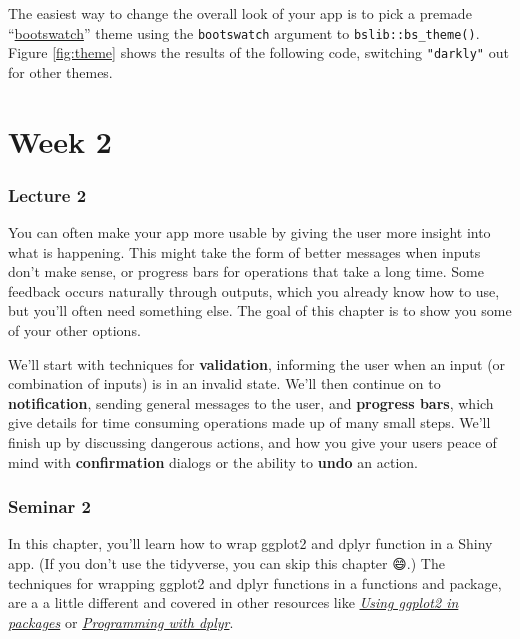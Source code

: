 \documentclass[
]{article}
\begin{document}
The easiest way to change the overall look of your app is to pick a premade ``\href{https://bootswatch.com}{bootswatch}'' theme using the \texttt{bootswatch} argument to \texttt{bslib::bs\_theme()}.
Figure \ref{fig:theme} shows the results of the following code, switching \texttt{"darkly"} out for other themes.

\hypertarget{part-week-2}{%
\part*{Week 2}\label{part-week-2}}

\hypertarget{lecture2}{%
\section{Lecture 2}\label{lecture2}}

You can often make your app more usable by giving the user more insight into what is happening.
This might take the form of better messages when inputs don't make sense, or progress bars for operations that take a long time.
Some feedback occurs naturally through outputs, which you already know how to use, but you'll often need something else.
The goal of this chapter is to show you some of your other options.

We'll start with techniques for \textbf{validation}, informing the user when an input (or combination of inputs) is in an invalid state.
We'll then continue on to \textbf{notification}, sending general messages to the user, and \textbf{progress bars}, which give details for time consuming operations made up of many small steps.
We'll finish up by discussing dangerous actions, and how you give your users peace of mind with \textbf{confirmation} dialogs or the ability to \textbf{undo} an action.

\hypertarget{seminar2}{%
\section{Seminar 2}\label{seminar2}}

In this chapter, you'll learn how to wrap ggplot2 and dplyr function in a Shiny app.
(If you don't use the tidyverse, you can skip this chapter 😄.) The techniques for wrapping ggplot2 and dplyr functions in a functions and package, are a a little different and covered in other resources like \href{http://ggplot2.tidyverse.org/dev/articles/ggplot2-in-packages.html}{\emph{Using ggplot2 in packages}} or \href{http://dplyr.tidyverse.org/articles/programming.html}{\emph{Programming with dplyr}}.
\end{document}
